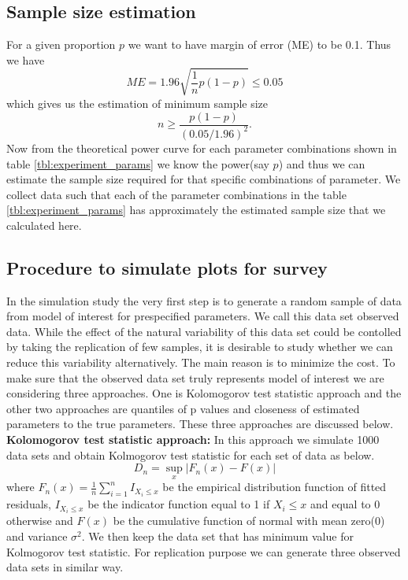 \documentclass[11pt]{article}
\begin{document}
\subsection{Sample size estimation} For a given proportion $p$ we want to have margin of error (ME) to be 0.1. Thus we have $$ME =1.96 \sqrt{ \frac 1 n p(1-p)} \le 0.05$$ which gives us the estimation of minimum sample size $$n \geq \frac{p(1-p)}{(0.05/1.96)^2}.$$ Now from the theoretical power curve for each parameter combinations shown in table \ref{tbl:experiment_params} we know the power(say $p$) and thus we can estimate the sample size required for that specific combinations of parameter. We collect data such that each of the parameter combinations in the table \ref{tbl:experiment_params} has approximately the estimated sample size that we calculated here.


\subsection{Procedure to simulate plots for survey} \label{sec:simulate_plot} In the simulation study the very first step is to generate a random sample of data from model of interest for prespecified parameters. We call this data set observed data. While the effect of the natural variability of this data set could be contolled by taking the replication of few samples, it is desirable to study whether we can reduce this variability alternatively. The main reason is to minimize the cost. To make sure that the observed data set truly represents model of interest we are considering three approaches. One is Kolomogorov test statistic approach and the other two approaches are quantiles of p values and closeness of estimated parameters to the true parameters. These three approaches are discussed below.\\

{\bf Kolomogorov test statistic approach:} In this approach we simulate 1000 data sets and obtain Kolmogorov test statistic for each set of data as below. $$D_n=\sup_x |F_n(x)-F(x)|$$ where $F_n(x)=\frac1n \sum_{i=1}^n I_{X_i\le x}$ be the empirical distribution function of fitted residuals, $I_{X_i\le x}$ be the indicator function equal to 1 if $X_i\le x$ and equal to 0 otherwise and $F(x)$ be the cumulative function of normal with mean zero(0) and variance $\sigma^2$. We then keep the data set that has minimum value for Kolmogorov test statistic.  For replication purpose we can generate three observed data sets in similar way.\\
\end{document}
